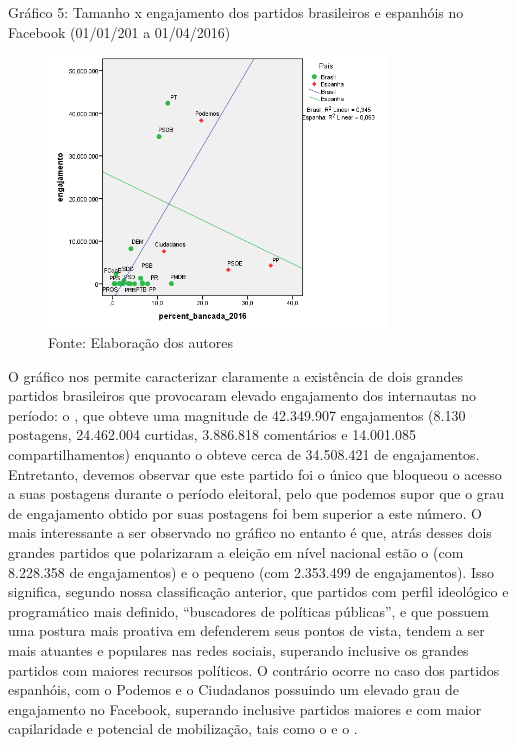 Gráfico 5: Tamanho x engajamento dos partidos brasileiros e espanhóis no
Facebook (01/01/201 a 01/04/2016)

\begin{figure}[!ht]
\centering
 \includegraphics[width=90mm]{./imgs/graf5.png}
\caption{Fonte: Elaboração dos autores}
\end{figure}

O gráfico nos permite caracterizar claramente a existência de dois
grandes partidos brasileiros que provocaram elevado engajamento dos
internautas no período: o , que obteve uma magnitude de 42.349.907
engajamentos (8.130 postagens, 24.462.004 curtidas, 3.886.818
comentários e 14.001.085 compartilhamentos) enquanto o  obteve cerca
de 34.508.421 de engajamentos. Entretanto, devemos observar que este
partido foi o único que bloqueou o acesso a suas postagens durante o
período eleitoral, pelo que podemos supor que o grau de engajamento
obtido por suas postagens foi bem superior a este número. O mais
interessante a ser observado no gráfico no entanto é que, atrás desses
dois grandes partidos que polarizaram a eleição em nível nacional estão
o  (com 8.228.358 de engajamentos) e o pequeno  (com 2.353.499 de
engajamentos). Isso significa, segundo nossa classificação anterior, que
partidos com perfil ideológico e programático mais definido,
``buscadores de políticas públicas'', e que possuem uma postura mais
proativa em defenderem seus pontos de vista, tendem a ser mais atuantes
e populares nas redes sociais, superando inclusive os grandes partidos
com maiores recursos políticos. O contrário ocorre no caso dos partidos
espanhóis, com o Podemos e o Ciudadanos possuindo um elevado grau de
engajamento no Facebook, superando inclusive partidos maiores e com
maior capilaridade e potencial de mobilização, tais como o  e o .

